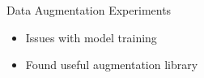 




\begin{frame}{Data Augmentation Experiments}
    \begin{itemize}
        \item Issues with model training
        \item Found useful augmentation library
    \end{itemize}
\end{frame}


